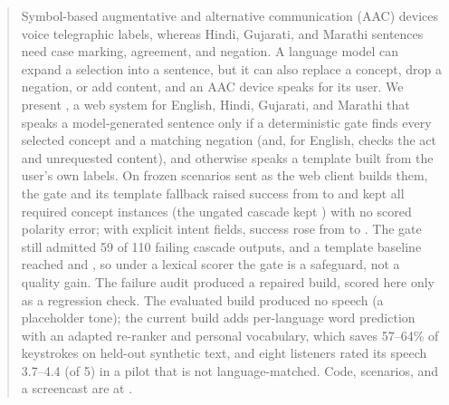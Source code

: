 \begin{abstract}
Symbol-based augmentative and alternative communication (AAC) devices voice telegraphic labels, whereas Hindi, Gujarati, and Marathi sentences need case marking, agreement, and negation.
A language model can expand a selection into a sentence, but it can also replace a concept, drop a negation, or add content, and an AAC device speaks for its user.
We present \sys{}, a web system for English, Hindi, Gujarati, and Marathi that speaks a model-generated sentence only if a deterministic gate finds every selected concept and a matching negation (and, for English, checks the act and unrequested content), and otherwise speaks a template built from the user's own labels.
On \NPrimAll{} frozen scenarios sent as the web client builds them, the gate and its template fallback raised success from \XPreUSuccPct{} to \XDepUSuccPct{} and kept all \NConc{} required concept instances (the ungated cascade kept \XPreUKept{}) with no scored polarity error; with explicit intent fields, success rose from \XPreSSuccPct{} to \XDepSSuccPct{}.
The gate still admitted 59 of 110 failing cascade outputs, and a template baseline reached \XTmplUSuccPct{} and \XTmplSSuccPct{}, so under a lexical scorer the gate is a safeguard, not a quality gain.
The failure audit produced a repaired build, scored here only as a regression check.
The evaluated build produced no speech (a placeholder tone); the current build adds per-language word prediction with an adapted re-ranker and personal vocabulary, which saves 57--64\% of keystrokes on held-out synthetic text, and eight listeners rated its speech 3.7--4.4 (of 5) in a pilot that is not language-matched.
Code, scenarios, and a screencast are at \demourl{}.
\end{abstract}
